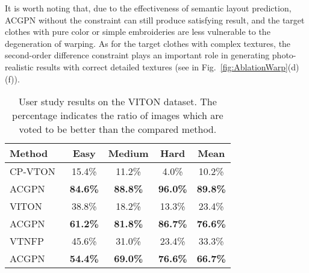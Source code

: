 \documentclass[10pt,twocolumn,letterpaper]{article}
\begin{document}
It is worth noting that, due to the effectiveness of semantic layout prediction, ACGPN without the constraint can still produce satisfying result, and the target clothes with pure color or simple embroideries are less vulnerable to the degeneration of warping.
As for the target clothes with complex textures, the second-order difference constraint plays an important role in generating photo-realistic results with correct detailed textures
(see in Fig.~\ref{fig:AblationWarp}(d)(f)).




\begin{table}
\renewcommand\tabcolsep{4pt}
\begin{center}
\footnotesize
\begin{tabular}{lcccc}
\hline
Method&Easy&Medium&Hard&Mean\\
\hline\hline
CP-VTON~\cite{DBLP:conf/eccv/WangZLCLY18}&15.4\%&11.2\%&4.0\%&10.2\%\\
ACGPN&\textbf{84.6\%}&\textbf{88.8\%}&\textbf{96.0\%}&\textbf{89.8\%}\\
\hline
VITON~\cite{DBLP:conf/cvpr/HanWWYD18}&38.8\%&18.2\%&13.3\%&23.4\%\\
ACGPN&\textbf{61.2\%}&\textbf{81.8\%}&\textbf{86.7\%}&\textbf{76.6\%}\\
\hline
VTNFP~\cite{Yu_2019_ICCV}&45.6\%&31.0\%&23.4\%&33.3\%\\
ACGPN&\textbf{54.4\%}&\textbf{69.0\%}&\textbf{76.6\%}&\textbf{66.7\%}\\





\hline

\end{tabular}

\caption{\footnotesize User study results on the VITON dataset. The percentage indicates the ratio of images which are voted to be better than the compared method.}
\label{tab:User_study}
\vspace{-20pt}
\end{center}
\end{table}
\end{document}
